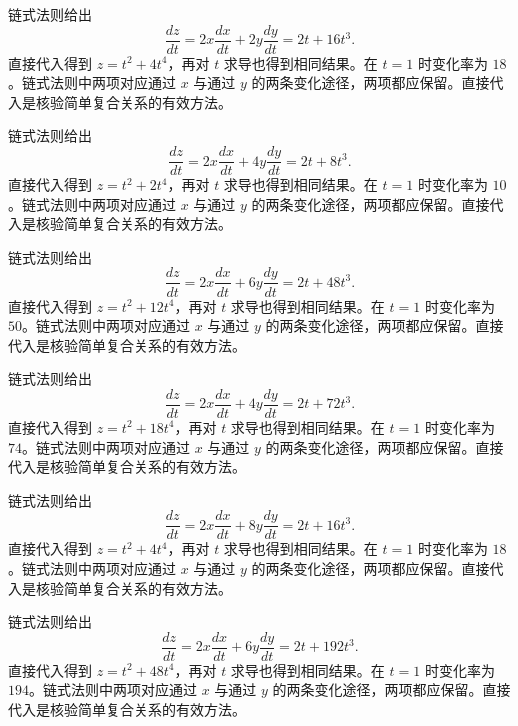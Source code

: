 \documentclass[UTF8,12pt,a4paper,fontset=fandol]{ctexart}
\begin{document}
\begin{solve}\label{ans:c34q2}
链式法则给出
\[
\frac{dz}{dt}=2x\frac{dx}{dt}+2y\frac{dy}{dt}=2t+16t^3.
\]
直接代入得到 $z=t^2+4t^4$，再对 $t$ 求导也得到相同结果。在 $t=1$ 时变化率为 $18$。链式法则中两项对应通过 $x$ 与通过 $y$ 的两条变化途径，两项都应保留。直接代入是核验简单复合关系的有效方法。
\end{solve}

\begin{solve}\label{ans:c34q3}
链式法则给出
\[
\frac{dz}{dt}=2x\frac{dx}{dt}+4y\frac{dy}{dt}=2t+8t^3.
\]
直接代入得到 $z=t^2+2t^4$，再对 $t$ 求导也得到相同结果。在 $t=1$ 时变化率为 $10$。链式法则中两项对应通过 $x$ 与通过 $y$ 的两条变化途径，两项都应保留。直接代入是核验简单复合关系的有效方法。
\end{solve}

\begin{solve}\label{ans:c34q4}
链式法则给出
\[
\frac{dz}{dt}=2x\frac{dx}{dt}+6y\frac{dy}{dt}=2t+48t^3.
\]
直接代入得到 $z=t^2+12t^4$，再对 $t$ 求导也得到相同结果。在 $t=1$ 时变化率为 $50$。链式法则中两项对应通过 $x$ 与通过 $y$ 的两条变化途径，两项都应保留。直接代入是核验简单复合关系的有效方法。
\end{solve}

\begin{solve}\label{ans:c34q5}
链式法则给出
\[
\frac{dz}{dt}=2x\frac{dx}{dt}+4y\frac{dy}{dt}=2t+72t^3.
\]
直接代入得到 $z=t^2+18t^4$，再对 $t$ 求导也得到相同结果。在 $t=1$ 时变化率为 $74$。链式法则中两项对应通过 $x$ 与通过 $y$ 的两条变化途径，两项都应保留。直接代入是核验简单复合关系的有效方法。
\end{solve}

\begin{solve}\label{ans:c34q6}
链式法则给出
\[
\frac{dz}{dt}=2x\frac{dx}{dt}+8y\frac{dy}{dt}=2t+16t^3.
\]
直接代入得到 $z=t^2+4t^4$，再对 $t$ 求导也得到相同结果。在 $t=1$ 时变化率为 $18$。链式法则中两项对应通过 $x$ 与通过 $y$ 的两条变化途径，两项都应保留。直接代入是核验简单复合关系的有效方法。
\end{solve}

\begin{solve}\label{ans:c34q7}
链式法则给出
\[
\frac{dz}{dt}=2x\frac{dx}{dt}+6y\frac{dy}{dt}=2t+192t^3.
\]
直接代入得到 $z=t^2+48t^4$，再对 $t$ 求导也得到相同结果。在 $t=1$ 时变化率为 $194$。链式法则中两项对应通过 $x$ 与通过 $y$ 的两条变化途径，两项都应保留。直接代入是核验简单复合关系的有效方法。
\end{solve}
\end{document}
